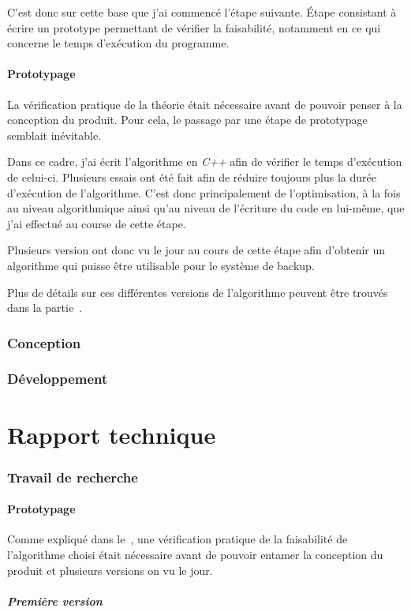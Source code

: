 \documentclass[a4paper,10pt, twoside]{report}
\begin{document}
\begin{spacing}{1.2}
C'est donc sur cette base que j'ai commenc\'e l'\'etape suivante. \'Etape 
consistant \`a \'ecrire un prototype permettant de v\'erifier la faisabilit\'e,
notamment en ce qui concerne le temps d'ex\'ecution du programme.

\subsubsection{Prototypage}
La v\'erification pratique de la th\'eorie \'etait n\'ecessaire avant de
pouvoir penser \`a la conception du produit. Pour cela, le passage par une
\'etape de prototypage semblait in\'evitable.

Dans ce cadre, j'ai \'ecrit l'algorithme en \textit{C++} afin de v\'erifier
le temps d'ex\'ecution de celui-ci. Plusieurs essais ont \'et\'e fait afin de
r\'eduire toujours plus la dur\'ee d'ex\'ecution de l'algorithme. C'est donc
principalement de l'optimisation, \`a la fois au niveau algorithmique ainsi
qu'au niveau de l'\'ecriture du code en lui-m\^eme, que j'ai effectu\'e  au
course de cette \'etape.

Plusieurs version ont donc vu le jour au cours de cette \'etape afin d'obtenir
un algorithme qui puisse \^etre utilisable pour le syst\`eme de backup.

Plus de d\'etails sur ces diff\'erentes versions de l'algorithme peuvent \^etre
trouv\'es dans la partie~.


\subsection{Conception}
\subsection{D\'eveloppement}

\chapter{Rapport technique}
\thispagestyle{fancy}
\label{rapportTechnique}
\subsection{Travail de recherche}
\subsubsection{Prototypage}
Comme expliqu\'e dans le~, une v\'erification pratique
de la faisabilit\'e de l'algorithme choisi \'etait n\'ecessaire avant de
pouvoir entamer la conception du produit et plusieurs versions on vu le jour.

\paragraph{Premi\`ere version}



\newpage
\listoffigures
\listoftables



\end{spacing}
\end{document}
